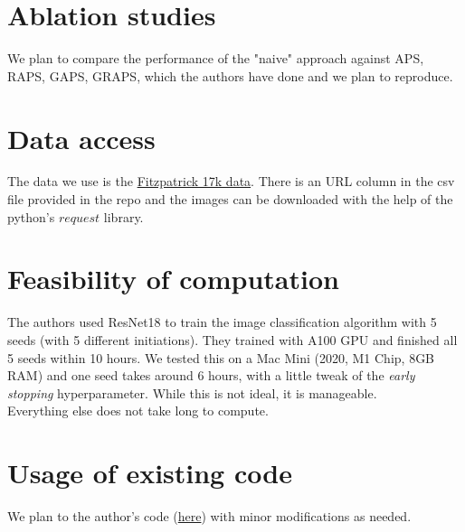 \documentclass{article}
\begin{document}
\section*{Ablation studies}
We plan to compare the performance of the "naive" approach against APS, RAPS, GAPS, GRAPS, which the authors have done and we plan to reproduce.

\section*{Data access}
The data we use is the \href{https://github.com/mattgroh/fitzpatrick17k}{Fitzpatrick 17k data}. There is an URL column in the csv file provided in the repo and the images can be downloaded with the help of the python's $request$ library.

\section*{Feasibility of computation}
The authors used ResNet18 to train the image classification algorithm with 5 seeds (with 5 different initiations). They trained with A100 GPU and finished all 5 seeds within 10 hours. We tested this on a Mac Mini (2020, M1 Chip, 8GB RAM) and one seed takes around 6 hours, with a little tweak of the \textit{early stopping} hyperparameter. While this is not ideal, it is manageable.\\

Everything else does not take long to compute.

\section*{Usage of existing code}
We plan to the author's code (\href{https://github.com/clu5/AAAI-22/tree/main}{here}) with minor modifications as needed. 





\end{document}
